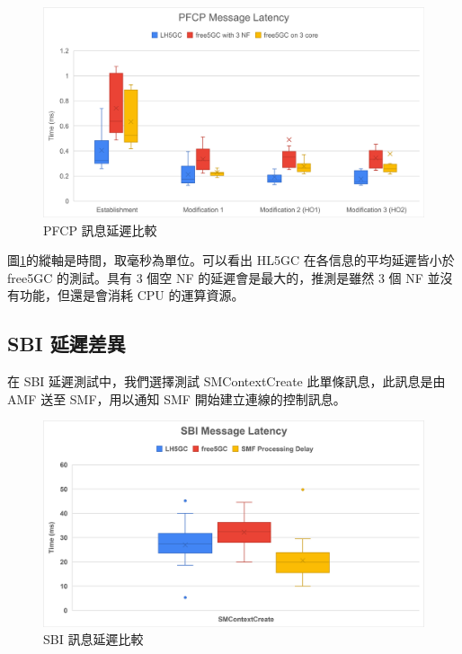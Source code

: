 \begin{figure}[htb]
    \centering
    \includegraphics[height=!,width=0.9\linewidth,keepaspectratio=true]{figures/cp_pfcp_comp}
    \caption[PFCP 訊息延遲比較]{{\footnotesize PFCP 訊息延遲比較}}
    \label{fig:cp_pfcp_comp}
\end{figure}

圖\ref{fig:cp_pfcp_comp}的縱軸是時間，取毫秒為單位。可以看出 HL5GC 在各信息的平均延遲皆小於 free5GC 的測試。具有 3 個空 NF 的延遲會是最大的，推測是雖然 3 個 NF 並沒有功能，但還是會消耗 CPU 的運算資源。

\subsection{SBI 延遲差異}
\label{subsec:sbi_comp}

在 SBI 延遲測試中，我們選擇測試 SMContextCreate 此單條訊息，此訊息是由 AMF 送至 SMF，用以通知 SMF 開始建立連線的控制訊息。

\begin{figure}[htbp]
    \centering
    \includegraphics[height=!,width=0.8\linewidth,keepaspectratio=true]{figures/cp_sbi_comp}
    \caption[SBI 訊息延遲比較]{{\footnotesize SBI 訊息延遲比較}}
    \label{fig:cp_sbi_comp}
\end{figure}

